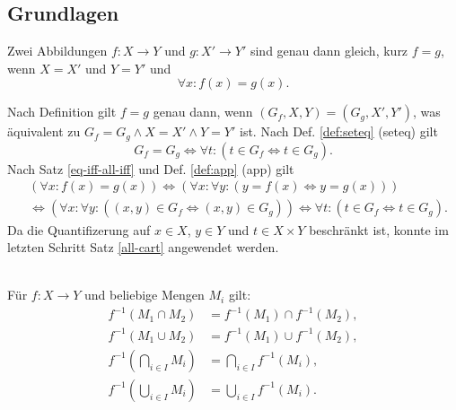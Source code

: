 \subsection{Grundlagen}
\begin{Satz}%
\label{feq}
Zwei Abbildungen $f\colon X\to Y$ und $g\colon X'\to Y'$ sind genau
dann gleich, kurz $f=g$, wenn $X=X'$ und $Y=Y'$ und
\[\forall x\colon f(x)=g(x).\]
\end{Satz}

\begin{Beweis}
Nach Definition gilt $f=g$ genau dann, wenn $(G_f,X,Y)=(G_g,X',Y')$,
was äquivalent zu $G_f=G_g\land X=X'\land Y=Y'$ ist. Nach Def.
\ref{def:seteq} (seteq) gilt
\[G_f=G_g\iff \forall t\colon (t\in G_f\Leftrightarrow t\in G_g).\]
Nach Satz \ref{eq-iff-all-iff} und Def. \ref{def:app} (app) gilt
\begin{align*}
&(\forall x\colon f(x)=g(x)) \iff (\forall x\colon\forall y\colon (y=f(x)\Leftrightarrow y=g(x)))\\
&\iff (\forall x\colon\forall y\colon((x,y)\in G_f\Leftrightarrow (x,y)\in G_g))
\iff \forall t\colon (t\in G_f\Leftrightarrow t\in G_g).
\end{align*}
Da die Quantifizerung auf $x\in X$, $y\in Y$ und $t\in X\times Y$
beschränkt ist, konnte im letzten Schritt Satz \ref{all-cart}
angewendet werden.\;\qedsymbol
\end{Beweis}

\begin{Satz}%
\label{preimg-dl}\mbox{}\\
Für $f\colon X\to Y$ und beliebige Mengen $M_i$ gilt:
\begin{align}
f^{-1}(M_1\cap M_2) &= f^{-1}(M_1)\cap f^{-1}(M_2),\\
f^{-1}(M_1\cup M_2) &= f^{-1}(M_1)\cup f^{-1}(M_2),\\
f^{-1}(\bigcap_{i\in I} M_i) &= \bigcap_{i\in I} f^{-1}(M_i),\\
f^{-1}(\bigcup_{i\in I} M_i) &= \bigcup_{i\in I} f^{-1}(M_i).
\end{align}
\end{Satz}

